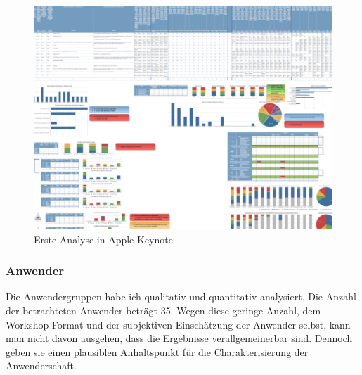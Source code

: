 \begin{figure}
  \centering
    \includegraphics[width=0.75\linewidth]{Figures/analysis-keynote.png}
  \caption{Erste Analyse in Apple Keynote}
  \label{fig:analysis-keynote}
\end{figure}


\subsubsection{Anwender}
\label{sec:results-users}

Die Anwendergruppen habe ich qualitativ und quantitativ analysiert. Die Anzahl der betrachteten Anwender beträgt 35. Wegen diese geringe Anzahl, dem Workshop-Format und der subjektiven Einschätzung der Anwender selbst, kann man nicht davon ausgehen, dass die Ergebnisse verallgemeinerbar sind. Dennoch geben sie einen plausiblen Anhaltspunkt für die Charakterisierung der Anwenderschaft.

